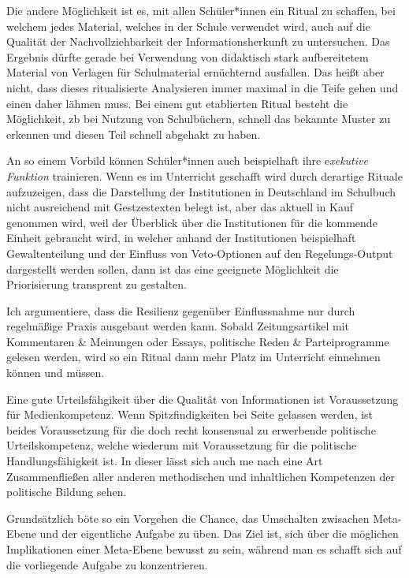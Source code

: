 Die andere Möglichkeit ist es, mit allen Schüler*innen ein Ritual zu schaffen, bei welchem jedes Material, welches in der Schule verwendet wird, auch auf die Qualität der Nachvollziehbarkeit der Informationsherkunft zu untersuchen. Das Ergebnis dürfte gerade bei Verwendung von didaktisch stark aufbereitetem Material von Verlagen für Schulmaterial ernüchternd ausfallen. Das heißt aber nicht, dass dieses ritualisierte Analysieren immer maximal in die Teife gehen und einen daher lähmen muss. Bei einem gut etablierten Ritual besteht die Möglichkeit, \gls{zb} bei Nutzung von Schulbüchern, schnell das bekannte Muster zu erkennen und diesen Teil schnell abgehakt zu haben. 

An so einem Vorbild können Schüler*innen auch beispielhaft ihre e\emph{xekutive Funktion} trainieren. Wenn es im Unterricht geschafft wird durch derartige Rituale aufzuzeigen, dass die Darstellung der Institutionen in Deutschland im Schulbuch nicht ausreichend mit Gestzestexten belegt ist, aber das aktuell in Kauf genommen wird, weil der Überblick über die Institutionen für die kommende Einheit gebraucht wird, in welcher anhand der Institutionen beispielhaft Gewaltenteilung und der Einfluss von Veto-Optionen auf den Regelungs-Output dargestellt werden sollen, dann ist das eine geeignete Möglichkeit die Priorisierung transprent zu gestalten. 

Ich argumentiere, dass die Resilienz gegenüber Einflussnahme nur durch regelmäßige Praxis ausgebaut werden kann. Sobald Zeitungsartikel mit Kommentaren \& Meinungen oder Essays, politische Reden \& Parteiprogramme gelesen werden, wird so ein Ritual dann mehr Platz im Unterricht einnehmen können und müssen. 

Eine gute Urteilsfähgikeit über die Qualität von Informationen ist Voraussetzung für Medienkompetenz. Wenn Spitzfindigkeiten bei Seite gelassen werden, ist beides Voraussetzung für die doch recht konsensual zu erwerbende politische Urteilskompetenz, welche wiederum mit Voraussetzung für die politische Handlungsfähigkeit ist. In dieser lässt sich auch \gls{me} nach eine Art Zusammenfließen aller anderen methodischen und inhaltlichen Kompetenzen der politische Bildung sehen. 

Grundsätzlich böte so ein Vorgehen die Chance, das Umschalten zwisachen Meta-Ebene und der eigentliche Aufgabe zu üben. Das Ziel ist, sich über die möglichen Implikationen einer Meta-Ebene bewusst zu sein, während man es schafft sich auf die vorliegende Aufgabe zu konzentrieren.
\bigskip

